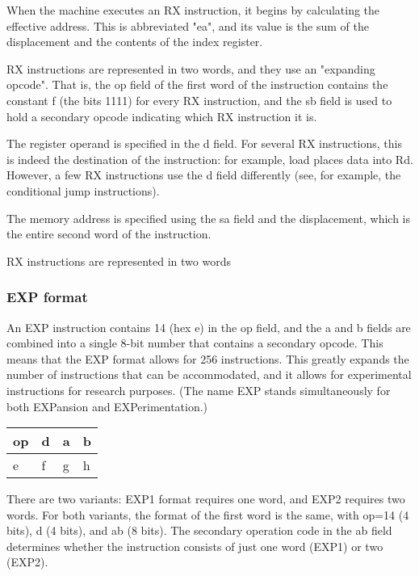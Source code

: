 \documentclass[11pt]{article}
\begin{document}
When the machine executes an RX instruction, it begins by calculating
the effective address.  This is abbreviated "ea", and its value is the
sum of the displacement and the contents of the index register.

RX instructions are represented in two words, and they use an
"expanding opcode".  That is, the op field of the first word of the
instruction contains the constant f (the bits 1111) for every RX
instruction, and the sb field is used to hold a secondary opcode
indicating which RX instruction it is.

The register operand is specified in the d field.  For several RX
instructions, this is indeed the destination of the instruction: for
example, load places data into Rd.  However, a few RX instructions use
the d field differently (see, for example, the conditional jump
instructions).

The memory address is specified using the sa field and the
displacement, which is the entire second word of the instruction.


RX instructions are represented in two words


\subsubsection*{EXP format}
\label{sec:org83ce8d9}

An EXP instruction contains 14 (hex e) in the op field, and the a and
b fields are combined into a single 8-bit number that contains a
secondary opcode.  This means that the EXP format allows for 256
instructions.  This greatly expands the number of instructions that
can be accommodated, and it allows for experimental instructions for
research purposes.  (The name EXP stands simultaneously for both
EXPansion and EXPerimentation.)

\begin{center}
\begin{tabular}{llll}
\hline
op & d & a & b\\
\hline
e & f & g & h\\
\hline
\end{tabular}
\end{center}

There are two variants: EXP1 format requires one word, and EXP2
requires two words.  For both variants, the format of the first word
is the same, with op=14 (4 bits), d (4 bits), and ab (8 bits).  The
secondary operation code in the ab field determines whether the
instruction consists of just one word (EXP1) or two (EXP2).
\end{document}
